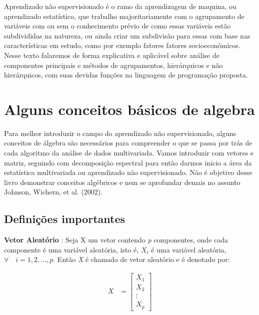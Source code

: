 \documentclass[
  letterpaper,
  DIV=11,
  numbers=noendperiod]{scrreprt}
\begin{document}
Aprendizado não supervisionado é o ramo da aprendizagem de maquina, ou
aprendizado estatístico, que trabalho majoritariamente com o agrupamento
de variáveis com ou sem o conhecimento prévio de como essas variáveis
estão subdivididas na natureza, ou ainda criar um subdivisão para essas
com base nas características em estudo, como por exemplo fatores fatores
socioeconômicos. Nesse texto falaremos de forma explicativa e aplicável
sobre análise de componentes principais e métodos de agrupamentos,
hierárquicos e não hierárquicos, com suas devidas funções na linguagem
de programação proposta.

\hypertarget{alguns-conceitos-buxe1sicos-de-algebra}{%
\section{Alguns conceitos básicos de
algebra}\label{alguns-conceitos-buxe1sicos-de-algebra}}

Para melhor introduzir o campo do aprendizado não supervisionado, alguns
conceitos de álgebra são necessários para compreender o que se passa por
trás de cada algoritmo da análise de dados multivariada. Vamos
introduzir com vetores e matriz, seguindo com decomposição espectral
para então darmos inicio a área da estatística multivariada ou
aprendizado não supervisionado. Não é objetivo desse livro demonstrar
conceitos algébricos e nem se aprofundar demais no assunto Johnson,
Wichern, et al. (2002).

\hypertarget{definiuxe7uxf5es-importantes}{%
\subsection{Definições importantes}\label{definiuxe7uxf5es-importantes}}

\textbf{Vetor Aleatório} : Seja X um vetor contendo \emph{p}
componentes, onde cada componente é uma variável aleatória, isto é,
\(X_i\) é uma variável aleatória, \(\forall\quad i =1,2,...,p\). Então
\emph{X} é chamado de vetor aleatório e é denotado por:

\[
 \begin{align}
  X &= \begin{bmatrix}
           X_{1} \\
           X_{2} \\
           \vdots \\
           X_{p}
         \end{bmatrix}
  \end{align}
\]
\end{document}

